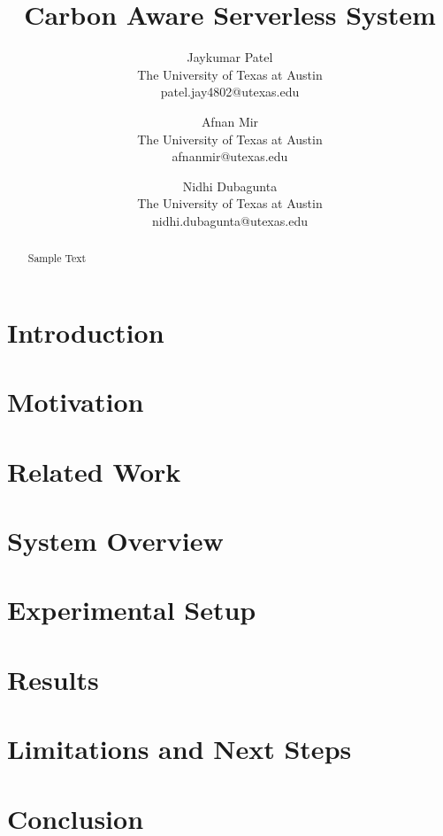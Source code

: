 \documentclass[times, 10pt,twocolumn]{article}
\begin{document}
\title{Carbon Aware Serverless System}

\author{Jaykumar Patel\\
The University of Texas at Austin\\
patel.jay4802@utexas.edu\\
\and
Afnan Mir\\
The University of Texas at Austin\\
afnanmir@utexas.edu\\
\and
Nidhi Dubagunta\\
The University of Texas at Austin\\
nidhi.dubagunta@utexas.edu
}



\maketitle
\thispagestyle{empty}

\begin{abstract}
   Sample Text
\end{abstract}


\section{Introduction}


\section{Motivation}


\section{Related Work}


\section{System Overview}


\section{Experimental Setup}


\section{Results}


\section{Limitations and Next Steps}


\section{Conclusion}



\end{document}
